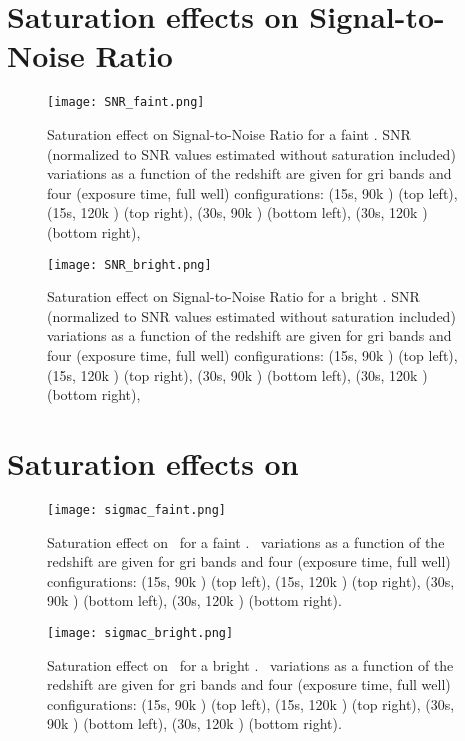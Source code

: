 \begin{appendices}
\section{Saturation effects on Signal-to-Noise Ratio}


\begin{figure}[htbp]
\begin{center}
  \texttt{[image: SNR\_faint.png]}
 \caption{Saturation effect on Signal-to-Noise Ratio for a faint \sne. SNR (normalized to SNR values estimated without saturation included) variations as a function of the redshift are given for gri bands and four (exposure time, full well) configurations: (15s, 90k \pe) (top left),  (15s, 120k \pe) (top right), (30s, 90k \pe) (bottom left),  (30s, 120k \pe) (bottom right),}\label{fig:snrfaint}
\end{center}
\end{figure}

\begin{figure}[htbp]
\begin{center}
  \texttt{[image: SNR\_bright.png]}
 \caption{Saturation effect on Signal-to-Noise Ratio for a bright \sne. SNR (normalized to SNR values estimated without saturation included) variations as a function of the redshift are given for gri bands and four (exposure time, full well) configurations: (15s, 90k \pe) (top left),  (15s, 120k \pe) (top right), (30s, 90k \pe) (bottom left),  (30s, 120k \pe) (bottom right),}\label{fig:snrbright}
\end{center}
\end{figure}

\section{Saturation effects on }

\begin{figure}[htbp]
\begin{center}
  \texttt{[image: sigmac\_faint.png]}
 \caption{Saturation effect on ~for a faint \sne. ~variations as a function of the redshift are given for gri bands and four (exposure time, full well) configurations: (15s, 90k \pe) (top left),  (15s, 120k \pe) (top right), (30s, 90k \pe) (bottom left),  (30s, 120k \pe) (bottom right).}\label{fig:sigmafaint}
\end{center}
\end{figure}

\begin{figure}[htbp]
\begin{center}
  \texttt{[image: sigmac\_bright.png]}
 \caption{Saturation effect on ~for a bright \sne. ~variations as a function of the redshift are given for gri bands and four (exposure time, full well) configurations: (15s, 90k \pe) (top left),  (15s, 120k \pe) (top right), (30s, 90k \pe) (bottom left),  (30s, 120k \pe) (bottom right).}\label{fig:sigmabright}
\end{center}
\end{figure}



\end{appendices}



